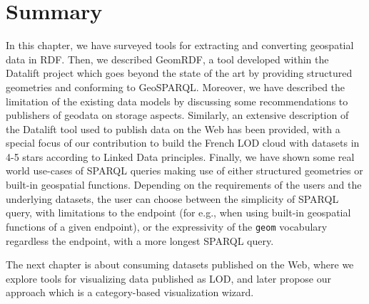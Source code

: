 \section{Summary}
\label{sec:ch2-summary}
In this chapter, we have surveyed tools for extracting and converting geospatial data in RDF. Then, we described GeomRDF, a tool developed within the Datalift project which goes beyond the state of the art by providing structured geometries and conforming to GeoSPARQL. Moreover, we have described the limitation of the existing data models by discussing some recommendations to publishers of geodata on storage aspects. Similarly, an extensive description of the Datalift tool used to publish data on the Web has been provided, with a special focus of our contribution to build the French LOD cloud with datasets in 4-5 stars according to Linked Data principles. Finally, we have shown some real world use-cases of SPARQL queries making use of either structured geometries or built-in geospatial functions. Depending on the requirements of the users and the underlying datasets, the user can choose between the simplicity of SPARQL query, with limitations to the endpoint (for e.g., when using built-in geospatial functions of a given endpoint), or the expressivity of the \texttt{geom} vocabulary regardless the endpoint, with a more longest SPARQL query.


The next chapter is about consuming datasets published on the Web, where we explore tools for visualizing data published as LOD, and later propose our approach which is a category-based visualization wizard.
